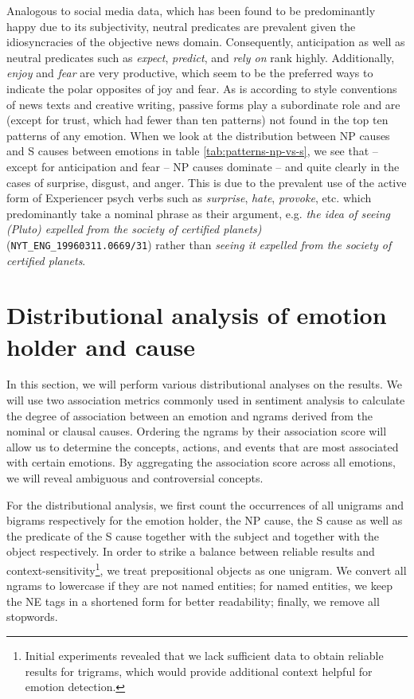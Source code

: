 Analogous to social media data, which has been found to be predominantly happy \cite{depechemood} due to its subjectivity, neutral predicates are prevalent given the idiosyncracies of the objective news domain. Consequently, anticipation as well as neutral predicates such as \textit{expect}, \textit{predict}, and \textit{rely on} rank highly. Additionally, \textit{enjoy} and \textit{fear} are very productive, which seem to be the preferred ways to indicate the polar opposites of joy and fear. As is according to style conventions of news texts and creative writing, passive forms play a subordinate role and are (except for trust, which had fewer than ten patterns) not found in the top ten patterns of any emotion. When we look at the distribution between NP causes and S causes between emotions in table \ref{tab:patterns-np-vs-s}, we see that -- except for anticipation and fear -- NP causes dominate -- and quite clearly in the cases of surprise, disgust, and anger. This is due to the prevalent use of the active form of Experiencer psych verbs such as \textit{surprise}, \textit{hate}, \textit{provoke}, etc. which predominantly take a nominal phrase as their argument, e.g. \textit{the idea of seeing (Pluto) expelled from the society of certified planets)} (\texttt{NYT\_ENG\_19960311.0669/31}) rather than \textit{seeing it expelled from the society of certified planets}.

\section{Distributional analysis of emotion holder and cause}

In this section, we will perform various distributional analyses on the results. We will use two association metrics commonly used in sentiment analysis to calculate the degree of association between an emotion and ngrams derived from the nominal or clausal causes. Ordering the ngrams by their association score will allow us to determine the concepts, actions, and events that are most associated with certain emotions. By aggregating the association score across all emotions, we will reveal ambiguous and controversial concepts.

For the distributional analysis, we first count the occurrences of all unigrams and bigrams respectively for the emotion holder, the NP cause, the S cause as well as the predicate of the S cause together with the subject and together with the object respectively. In order to strike a balance between reliable results and context-sensitivity\footnote{Initial experiments revealed that we lack sufficient data to obtain reliable results for trigrams, which would provide additional context helpful for emotion detection.}, we treat prepositional objects as one unigram. We convert all ngrams to lowercase if they are not named entities; for named entities, we keep the NE tags in a shortened form for better readability; finally, we remove all stopwords.

